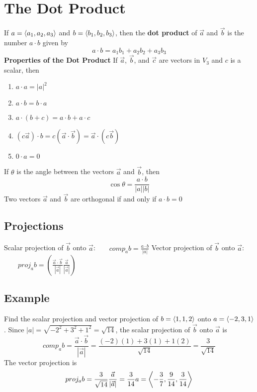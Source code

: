 \section{The Dot Product}
If $a = \ev{a_1, a_2, a_3}$ and $b = \ev{b_1, b_2, b_3}$, then the \textbf{dot product} of $\vec{a}$ and $\vec{b}$ is the number $a\cdot b$ given by 
$$a\cdot b = a_1b_1 + a_2b_2 + a_3b_3$$
\textbf{Properties of the Dot Product}
If $\vec{a}$, $\vec{b}$, and $\vec{c}$ are vectors in $V_3$ and $c$ is a scalar, then
\begin{enumerate}
    \item $a\cdot a = |a|^2$
    \item $a\cdot b = b\cdot a$
    \item $a\cdot (b + c) = a\cdot b + a\cdot c$
    \item $(c\vec{a})\cdot b = c(\vec{a}\cdot \vec{b}) = \vec{a}\cdot (c\vec{b})$
    \item $0\cdot a = 0$
\end{enumerate}
If $\theta$ is the angle between the vectors $\vec{a}$ and $\vec{b}$, then
$$\cos{\theta} = \frac{a\cdot b}{|a||b|}$$
Two vectors $\vec{a}$ and $\vec{b}$ are orthogonal if and only if $a\cdot b = 0$

\subsection*{Projections}
Scalar projection of $\vec{b}$ onto $\vec{a}$:$\qquad comp_ab = \frac{a\cdot b}{|a|}$
Vector projection of $\vec{b}$ onto $\vec{a}$:$\qquad proj_ab = \left(\frac{\vec{a}\cdot\vec{b}}{|\vec{a}|}\frac{\vec{a}}{|\vec{a}|}\right)$

\subsection*{Example}
Find the scalar projection and vector projection of $b = \ev{1, 1, 2}$ onto $a = \ev{-2,3,1}$.
Since $|a| = \sqrt{{-2}^2 + 3^2 + 1^2} = \sqrt{14}$, the scalar projection of $\vec{b}$ onto $\vec{a}$ is 
$$comp_ab = \frac{\vec{a}\cdot\vec{b}}{|\vec{a}|} = \frac{(-2)(1) + 3(1) + 1(2)}{\sqrt{14}} = \frac{3}{\sqrt{14}}$$
The vector projection is $$proj_ab = \frac{3}{\sqrt{14}}\frac{\vec{a}}{|\vec{a}|} = \frac{3}{14}a = \ev{-\frac{3}{7}, \frac{9}{14}, \frac{3}{14}}$$

